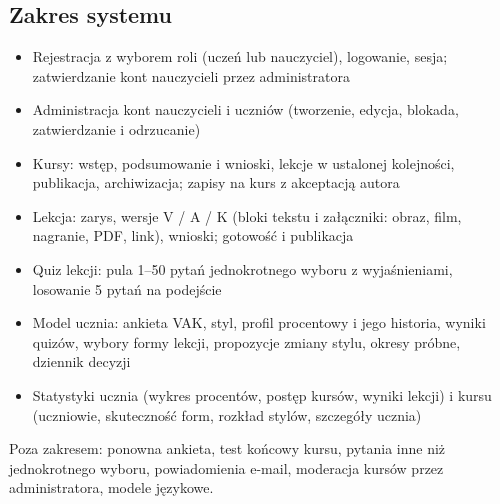 \subsection{Zakres systemu}

\begin{itemize}[leftmargin=*]
    \item Rejestracja z wyborem roli (uczeń lub nauczyciel), logowanie, sesja; zatwierdzanie kont nauczycieli przez administratora
    \item Administracja kont nauczycieli i uczniów (tworzenie, edycja, blokada, zatwierdzanie i odrzucanie)
    \item Kursy: wstęp, podsumowanie i wnioski, lekcje w ustalonej kolejności, publikacja, archiwizacja; zapisy na kurs z akceptacją autora
    \item Lekcja: zarys, wersje V / A / K (bloki tekstu i załączniki: obraz, film, nagranie, PDF, link), wnioski; gotowość i publikacja
    \item Quiz lekcji: pula 1--50 pytań jednokrotnego wyboru z wyjaśnieniami, losowanie 5 pytań na podejście
    \item Model ucznia: ankieta VAK, styl, profil procentowy i jego historia, wyniki quizów, wybory formy lekcji, propozycje zmiany stylu, okresy próbne, dziennik decyzji
    \item Statystyki ucznia (wykres procentów, postęp kursów, wyniki lekcji) i kursu (uczniowie, skuteczność form, rozkład stylów, szczegóły ucznia)
\end{itemize}

Poza zakresem: ponowna ankieta, test końcowy kursu, pytania inne niż jednokrotnego wyboru, powiadomienia e-mail, moderacja kursów przez administratora, modele językowe.
